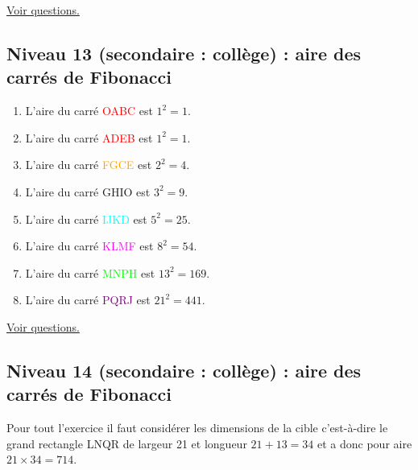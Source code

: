\documentclass[11pt]{article}
\begin{document}
\hyperref[org1a7aca1]{Voir questions.}


\newpage

\subsection{Niveau 13 (secondaire : collège) : aire des carrés de Fibonacci}
\label{sec:orgf17014f}

\label{org977d524}


\begin{enumerate}
\item L'aire du carré \textcolor{red}{OABC} est \(1^2 = 1\).
\item L'aire du carré \textcolor{red}{ADEB} est \(1^2 = 1\).
\item L'aire du carré \textcolor{orange}{FGCE} est \(2^2 = 4\).
\item L'aire du carré \textcolor{citron}{GHIO} est \(3^2 = 9\).
\item L'aire du carré \textcolor{cyan}{IJKD} est \(5^2 = 25\).
\item L'aire du carré \textcolor{magenta}{KLMF} est \(8^2 = 54\).
\item L'aire du carré \textcolor{lime}{MNPH} est \(13^2 = 169\).
\item L'aire du carré \textcolor{purple}{PQRJ} est \(21^2 = 441\).
\end{enumerate}


\hyperref[org99fe2c8]{Voir questions.}


\newpage

\subsection{Niveau 14 (secondaire : collège) : aire des carrés de Fibonacci}
\label{sec:orgb521759}
\label{orgdba72ef}

Pour tout l'exercice il faut considérer les dimensions de la cible
c'est-à-dire le grand rectangle LNQR de largeur 21 et longueur \(21 +
13 = 34\) et a donc pour aire \(21\times 34 = 714\).
\end{document}
